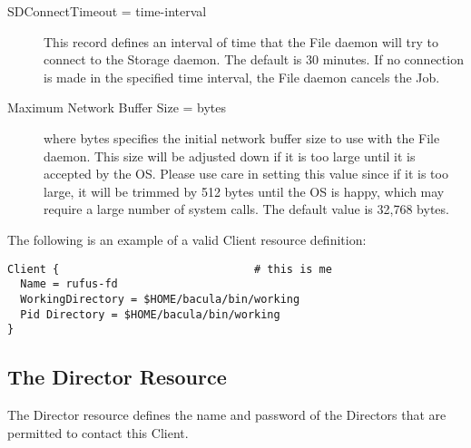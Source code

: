 \begin{description}
\item [SDConnectTimeout = \lt{}time-interval\gt{}]
   This  record defines an interval of time that  the File daemon will try to
connect to the  Storage daemon. The default is 30 minutes. If no connection 
is made in the specified time interval, the File daemon  cancels the Job. 

\item [Maximum Network Buffer Size = \lt{}bytes\gt{}]  
   where \lt{}bytes\gt{} specifies the initial network buffer  size to use with
the File daemon. This size will be adjusted down  if it is too large until it
is accepted by the OS. Please use  care in setting this value since if it is
too large, it will  be trimmed by 512 bytes until the OS is happy, which may
require  a large number of system calls. The default value is 32,768 bytes. 
\end{description}

The following is an example of a valid Client resource definition: 

\footnotesize
\begin{verbatim}
Client {                              # this is me
  Name = rufus-fd
  WorkingDirectory = $HOME/bacula/bin/working
  Pid Directory = $HOME/bacula/bin/working
}
\end{verbatim}
\normalsize

\subsection*{The Director Resource}
\label{DirectorResource}

The Director resource defines the name and password of the Directors that are
permitted to contact this Client. 

